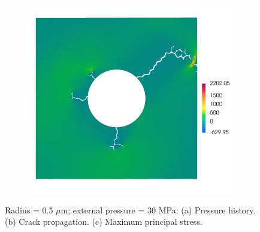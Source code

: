 \begin{figure}[htb!]
\begin{subfigure}[t]{0.32\linewidth}
    \caption{}
  \end{subfigure}
  \begin{subfigure}[t]{0.32\linewidth}
    \centering
    \includegraphics[width=\linewidth]{Chapter3/figures/r5_ext30_stress}
    \caption{}
  \end{subfigure}
  \caption{\label{fig:r5_30} Radius = 0.5 $\mu$m; external pressure = 30 MPa: (a) Pressure history. (b) Crack propagation. (c) Maximum principal stress.}
\end{figure}

